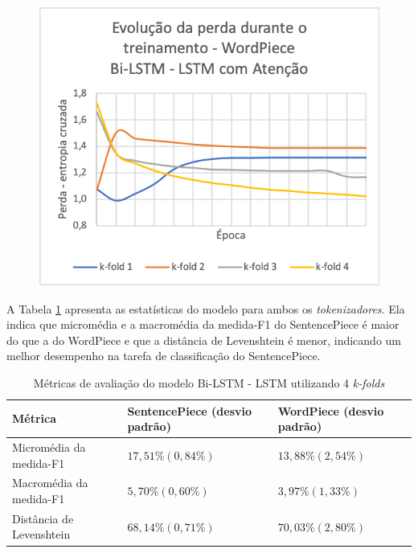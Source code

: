 \begin{figure}[htbp]
\begin{minipage}{0.49\textwidth}
            \includegraphics[width=\textwidth]{resources/images/results/result_train_loss_wordpiece_lstm_ptbr.png}
            \label{fig:result_train_loss_lstm_wordpiece}
    \end{minipage}
\end{figure}

A Tabela \ref{table:lstm_lstm_statistics} apresenta as estatísticas do modelo para ambos os \textit{tokenizadores}. Ela indica que micromédia e a macromédia da medida-F1 do SentencePiece é maior do que a do WordPiece e que a distância de Levenshtein é menor, indicando um melhor desempenho na tarefa de classificação do SentencePiece.
\begin{table}[ht!]
    \caption{Métricas de avaliação do modelo Bi-LSTM - LSTM utilizando 4 \textit{k-folds}}
    \label{table:lstm_lstm_statistics}
    \centering
    \begin{tabular}{
        >{\centering\arraybackslash}m{} | >{\centering\arraybackslash}m{} | >{\centering\arraybackslash}m{}}
        \hline
        Métrica & SentencePiece (desvio padrão) & WordPiece (desvio padrão) \\
        \hline
        Micromédia da medida-F1 & $17,51\% (0,84\%)$ & $13,88\% (2,54\%)$ \\
        \hline
        Macromédia da medida-F1 & $5,70\% (0,60\%)$ & $3,97\% (1,33\%)$ \\
        \hline
        Distância de Levenshtein & $68,14\% (0,71\%)$ & $70,03\% (2,80\%)$ \\
        \hline
        \end{tabular}
\end{table}

